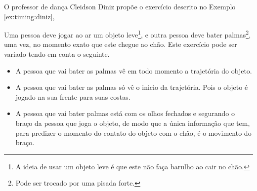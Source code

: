 O professor de dança Cleidson Diniz propõe \cite{TimingTreino1} 
o exercício descrito no Exemplo \ref{ex:timing:diniz},
\begin{example}
\label{ex:timing:diniz}
Uma pessoa deve jogar ao ar um objeto leve\footnote{A ideia de usar um objeto leve 
é que este não faça barulho ao cair no chão.}, 
e outra pessoa deve bater palmas\footnote{Pode ser trocado por uma pisada forte.}, 
uma vez, no momento exato que este chegue ao chão.
Este exercício pode ser variado tendo em conta o seguinte.
\begin{itemize}
\item A pessoa que vai bater as palmas vê em todo momento a trajetória do objeto.
\item A pessoa que vai bater as palmas só vê o inicio da trajetória. 
Pois o objeto é jogado na sua frente para suas costas.
\item A pessoa que vai bater palmas está com os olhos fechados
e segurando o braço da pessoa que joga o objeto,
de modo que a única informação que tem, 
para predizer o momento do contato do objeto com o chão, 
é o movimento do braço. 
\end{itemize}
\vspace{-10pt}
\end{example}



